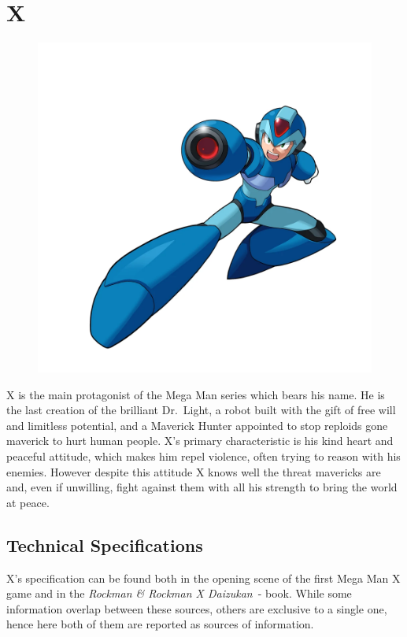 \chapter{X}\label{char:X}
\begin{figure}[h]
	\centering
	\includegraphics[width=0.6\linewidth]{figures/Characters/Char_MMX.png}
\end{figure}

X is the main protagonist of the Mega Man series which bears his name. He is the last creation of the brilliant Dr.~Light, a robot built with the gift of free will and limitless potential, and a Maverick Hunter appointed to stop reploids gone maverick to hurt human people. 
X's primary characteristic is his kind heart and peaceful attitude, which makes him repel violence, often trying to reason with his enemies. However despite this attitude X knows well the threat mavericks are and, even if unwilling, fight against them with all his strength to bring the world at peace.

\section{Technical Specifications}
X's specification can be found both in the opening scene of the first Mega Man X game and in the \emph{Rockman \& Rockman X Daizukan}~\cite{book:RRXD}-\cite{X_specs_translated} book. While some information overlap between these sources, others are exclusive to a single one, hence here both of them are reported as sources of information.

